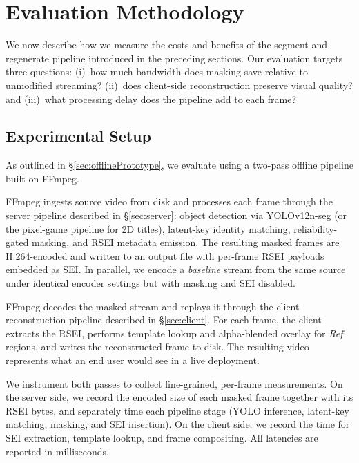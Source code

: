 \section{Evaluation Methodology}
\label{sec:EvaluationMethodology}

We now describe how we measure the costs and benefits of the segment-and-regenerate pipeline introduced in the preceding sections.
Our evaluation targets three questions: (i)~how much bandwidth does masking save relative to unmodified streaming? (ii)~does client-side reconstruction preserve visual quality? and (iii)~what processing delay does the pipeline add to each frame?

\subsection{Experimental Setup}
\label{sec:experimentalSetup}

As outlined in \S\ref{sec:offlinePrototype}, we evaluate \sysname using a two-pass offline pipeline built on FFmpeg.

FFmpeg ingests source video from disk and processes each frame through the server pipeline described in \S\ref{sec:server}: object detection via YOLOv12n-seg (or the pixel-game pipeline for 2D titles), latent-key identity matching, reliability-gated masking, and RSEI metadata emission.
The resulting masked frames are H.264-encoded and written to an output file with per-frame RSEI payloads embedded as SEI.
In parallel, we encode a \emph{baseline} stream from the same source under identical encoder settings but with masking and SEI disabled.

FFmpeg decodes the masked stream and replays it through the client reconstruction pipeline described in \S\ref{sec:client}.
For each frame, the client extracts the RSEI, performs template lookup and alpha-blended overlay for \emph{Ref} regions, and writes the reconstructed frame to disk.
The resulting video represents what an end user would see in a live deployment.

We instrument both passes to collect fine-grained, per-frame measurements.
On the server side, we record the encoded size of each masked frame together with its RSEI bytes, and separately time each pipeline stage (YOLO inference, latent-key matching, masking, and SEI insertion).
On the client side, we record the time for SEI extraction, template lookup, and frame compositing.
All latencies are reported in milliseconds.

